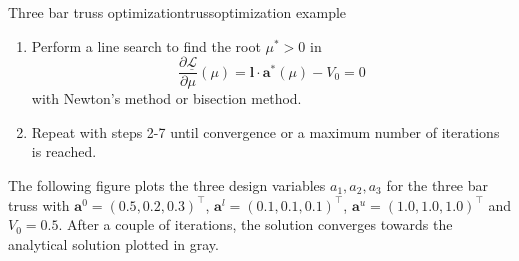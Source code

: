 \begin{example}{Three bar truss optimization}{trussoptimization example}
\begin{enumerate}
\begin{align}
                \mathbf{a}^* (\mu) &= \max\left(\tilde{\mathbf{a}}^{l,k}, \min \left(\hat{\mathbf{a}}(\mu), \mathbf{a}_u \right)\right)
            \end{align}
        \item Perform a line search to find the root $\mu^*>0$ in 
        \begin{equation}
            \frac{\partial \underline{\mathcal{L}}}{\partial \mu}(\mu) = \mathbf{l} \cdot \mathbf{a}^* (\mu) - V_0 = 0
        \end{equation}
        with Newton's method or bisection method. 
        \item Repeat with steps 2-7 until convergence or a maximum number of iterations is reached.
    \end{enumerate}

    The following figure plots the three design variables $a_1, a_2, a_3$ for the three bar truss with $\mathbf{a}^0=(0.5,0.2,0.3)^\top$, $\mathbf{a}^l=(0.1,0.1,0.1)^\top$, $\mathbf{a}^u=(1.0,1.0,1.0)^\top$ and $V_0=0.5$. After a couple of iterations, the solution converges towards the analytical solution plotted in gray.


\end{example}
